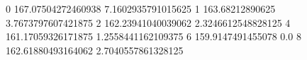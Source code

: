 0 167.07504272460938 7.1602935791015625
1 163.68212890625 3.7673797607421875
2 162.23941040039062 2.3246612548828125
4 161.17059326171875 1.2558441162109375
6 159.9147491455078 0.0
8 162.61880493164062 2.7040557861328125
